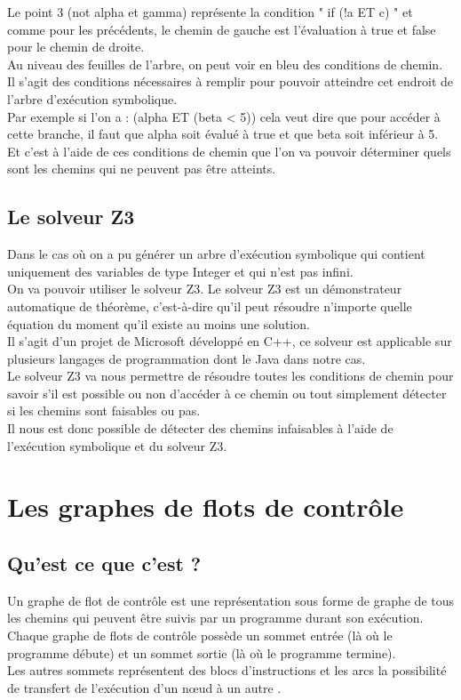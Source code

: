 \documentclass[a4paper,twoside,12pt,openright]{report}
\begin{document}
Le point 3 (not alpha et gamma) représente la condition " if (!a ET c) " et comme pour les précédents, le chemin de gauche est l’évaluation à true et false pour le chemin de droite.\\

Au niveau des feuilles de l’arbre, on peut voir en bleu des conditions de chemin.\\
Il s’agit des conditions nécessaires à remplir pour pouvoir atteindre cet endroit de l’arbre d’exécution symbolique.\\

Par exemple si l’on a : (alpha ET (beta < 5)) cela veut dire que pour accéder à cette branche, il faut que alpha soit évalué à true et que beta soit inférieur à 5.\\
Et c’est à l’aide de ces conditions de chemin que l’on va pouvoir déterminer quels sont les chemins qui ne peuvent pas être atteints.\\

\subsection{Le solveur Z3}

Dans le cas où on a pu générer un arbre d’exécution symbolique qui contient uniquement des variables de type Integer et qui n’est pas infini.\\
On va pouvoir utiliser le solveur Z3. Le solveur Z3 est un démonstrateur automatique de théorème, c’est-à-dire qu’il peut résoudre n’importe quelle équation du moment qu’il existe au moins une solution.\\
Il s’agit d’un projet de Microsoft développé en C++, ce solveur est applicable sur plusieurs langages de programmation dont le Java dans notre cas.\\
Le solveur Z3 va nous permettre de résoudre toutes les conditions de chemin pour savoir s’il est possible ou non d’accéder à ce chemin ou tout simplement détecter si les chemins sont faisables ou pas.\\
Il nous est donc possible de détecter des chemins infaisables à l'aide de l'exécution symbolique et du solveur Z3.\\


\newpage

\section{Les graphes de flots de contrôle}
\subsection{Qu'est ce que c'est ?}
Un graphe de flot de contrôle est une représentation sous forme de graphe de tous les chemins qui peuvent être suivis par un programme durant son exécution.\\
Chaque graphe de flots de contrôle possède un sommet entrée (là où le programme débute) et un sommet sortie (là où le programme termine).\\
Les autres sommets représentent des blocs d'instructions et les arcs la possibilité de transfert de l'exécution d'un nœud à un autre \cite{ref11}.
\end{document}
